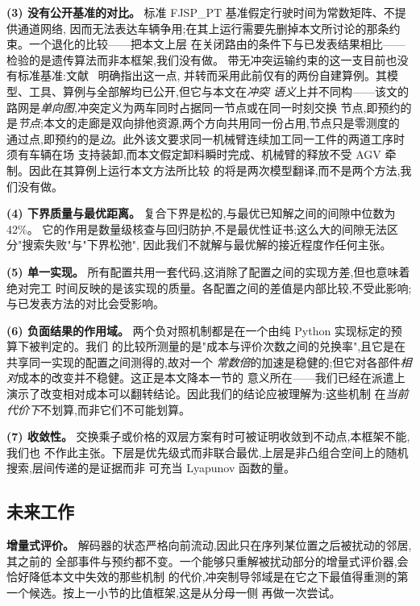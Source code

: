\documentclass[manuscript,screen,review]{acmart}
\newcommand{\LBGapMed}{42\%}
\begin{document}
\textbf{(3) 没有公开基准的对比。} 标准 FJSP\_PT 基准假定行驶时间为常数矩阵、不提供通道网络,
因而无法表达车辆争用;在其上运行需要先删掉本文所讨论的那条约束。一个退化的比较——把本文上层
在关闭路由的条件下与已发表结果相比——检验的是遗传算法而非本框架,我们没有做。
带无冲突运输约束的这一支目前也没有标准基准:文献~\cite{vanos2026exact} 明确指出这一点,
并转而采用此前仅有的两份自建算例。其模型、工具、算例与全部解均已公开,但它与本文在\emph{冲突
语义}上并不同构——该文的路网是\emph{单向图},冲突定义为两车同时占据同一节点或在同一时刻交换
节点,即预约的是\emph{节点};本文的走廊是双向排他资源,两个方向共用同一份占用,节点只是零测度的
通过点,即预约的是\emph{边}。此外该文要求同一机械臂连续加工同一工件的两道工序时须有车辆在场
支持装卸,而本文假定卸料瞬时完成、机械臂的释放不受 AGV 牵制。因此在其算例上运行本文方法所比较
的将是两次模型翻译,而不是两个方法,我们没有做。

\textbf{(4) 下界质量与最优距离。} 复合下界是松的,与最优已知解之间的间隙中位数为 \LBGapMed{}。
它的作用是数量级核查与回归防护,不是最优性证书;这么大的间隙无法区分"搜索失败"与"下界松弛",
因此我们不就解与最优解的接近程度作任何主张。

\textbf{(5) 单一实现。} 所有配置共用一套代码,这消除了配置之间的实现方差,但也意味着绝对完工
时间反映的是该实现的质量。各配置之间的差值是内部比较,不受此影响;与已发表方法的对比会受影响。

\textbf{(6) 负面结果的作用域。} 两个负对照机制都是在一个由纯 Python 实现标定的预算下被判定的。我们
的比较所测量的是"成本与评价次数之间的兑换率",且它是在共享同一实现的配置之间测得的,故对一个
\emph{常数倍}的加速是稳健的;但它对各部件\emph{相对}成本的改变并不稳健。这正是本文降本一节的
意义所在——我们已经在派遣上演示了改变相对成本可以翻转结论。因此我们的结论应被理解为:这些机制
在\emph{当前代价下}不划算,而非它们不可能划算。

\textbf{(7) 收敛性。} 交换乘子或价格的双层方案有时可被证明收敛到不动点,本框架不能,我们也
不作此主张。下层是优先级式而非联合最优,上层是非凸组合空间上的随机搜索,层间传递的是证据而非
可充当 Lyapunov 函数的量。

\subsection{未来工作}
\label{sec:future_work}

\textbf{增量式评价。} 解码器的状态严格向前流动,因此只在序列某位置之后被扰动的邻居,其之前的
全部事件与预约都不变。一个能够只重解被扰动部分的增量式评价器,会恰好降低本文中失效的那些机制
的代价,冲突制导邻域是在它之下最值得重测的第一个候选。按上一小节的比值框架,这是从分母一侧
再做一次尝试。
\end{document}
